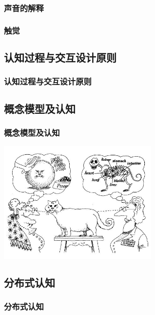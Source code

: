\documentclass{beamer}
\begin{document}
\begin{frame}
	\frametitle{声音的解释}

\end{frame}

\begin{frame}
	\frametitle{触觉}

\end{frame}

\subsection{认知过程与交互设计原则}
\begin{frame}
	\frametitle{认知过程与交互设计原则}

\end{frame}

\subsection{概念模型及认知}
\begin{frame}
	\frametitle{概念模型及认知}
	\begin{center}
		\includegraphics[width=8cm]{images/viewpoint.jpg}
	\end{center}
\end{frame}

\subsection{分布式认知}
\begin{frame}
	\frametitle{分布式认知}

\end{frame}
\end{document}
